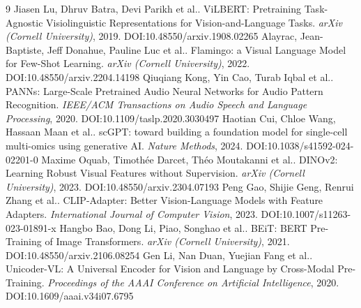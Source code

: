 \documentclass[11pt]{article}
\begin{document}
\begin{thebibliography}{9}
 Jiasen Lu, Dhruv Batra, Devi Parikh et al.. ViLBERT: Pretraining Task-Agnostic Visiolinguistic Representations for Vision-and-Language Tasks. \emph{arXiv (Cornell University)}, 2019. DOI:10.48550/arxiv.1908.02265
 Alayrac, Jean-Baptiste, Jeff Donahue, Pauline Luc et al.. Flamingo: a Visual Language Model for Few-Shot Learning. \emph{arXiv (Cornell University)}, 2022. DOI:10.48550/arxiv.2204.14198
 Qiuqiang Kong, Yin Cao, Turab Iqbal et al.. PANNs: Large-Scale Pretrained Audio Neural Networks for Audio Pattern Recognition. \emph{IEEE/ACM Transactions on Audio Speech and Language Processing}, 2020. DOI:10.1109/taslp.2020.3030497
 Haotian Cui, Chloe Wang, Hassaan Maan et al.. scGPT: toward building a foundation model for single-cell multi-omics using generative AI. \emph{Nature Methods}, 2024. DOI:10.1038/s41592-024-02201-0
 Maxime Oquab, Timothée Darcet, Théo Moutakanni et al.. DINOv2: Learning Robust Visual Features without Supervision. \emph{arXiv (Cornell University)}, 2023. DOI:10.48550/arxiv.2304.07193
 Peng Gao, Shijie Geng, Renrui Zhang et al.. CLIP-Adapter: Better Vision-Language Models with Feature Adapters. \emph{International Journal of Computer Vision}, 2023. DOI:10.1007/s11263-023-01891-x
 Hangbo Bao, Dong Li, Piao, Songhao et al.. BEiT: BERT Pre-Training of Image Transformers. \emph{arXiv (Cornell University)}, 2021. DOI:10.48550/arxiv.2106.08254
 Gen Li, Nan Duan, Yuejian Fang et al.. Unicoder-VL: A Universal Encoder for Vision and Language by Cross-Modal Pre-Training. \emph{Proceedings of the AAAI Conference on Artificial Intelligence}, 2020. DOI:10.1609/aaai.v34i07.6795
\end{thebibliography}
\end{document}
